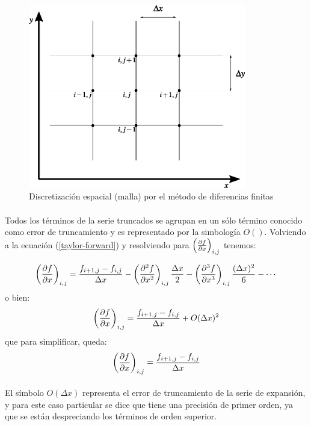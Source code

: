 \documentclass[letterpaper, openright, 12pt]{book}
\begin{document}
    \begin{figure}[htbp!]
        \centering
        \includegraphics[keepaspectratio, width=95mm]{./Imagenes/malla-DF1}
        \caption[Discretización por Diferencias Finitas]{Discretización espacial
          (malla) por el método de diferencias finitas \cite{anderson-yotros}}
        \label{malla-DF1}
    \end{figure}

    \paragraph*{}
    Todos los términos de la serie truncados se agrupan en un sólo término
    conocido como error de truncamiento y es representado por la simbología
    $O()$. Volviendo a la ecuación (\ref{taylor-forward}) y resolviendo para
    $\left( \pdv{f}{x} \right)_{i,j}$ tenemos:

    \begin{equation}
    \left( \pdv{f}{x} \right)_{i,j} = \frac{f_{i+1, j} - f_{i,j}}{\Delta x} - \left( \pdv[2]{f}{x} \right)_{i,j} \frac{\Delta x}{2} - \left( \pdv[3]{f}{x} \right)_{i,j} \frac{(\Delta x)^2}{6} - \dotsb
    \end{equation}
    o bien:
    \begin{equation*}
    \left( \pdv{f}{x} \right)_{i,j} = \frac{f_{i+1, j} - f_{i,j}}{\Delta x} + O(\Delta x)^2
    \end{equation*}
    que para simplificar, queda:\\
    \begin{equation}
    \left( \pdv{f}{x} \right)_{i,j} = \frac{f_{i+1, j} - f_{i,j}}{\Delta x}
    \label{forward-x1}
    \end{equation}

    \paragraph*{}
    El símbolo $O(\Delta x)$ representa el error de truncamiento de la serie de
    expansión, y para este caso particular se dice que tiene una precisión de
    primer orden, ya que se están despreciando los términos de orden superior.
\end{document}
